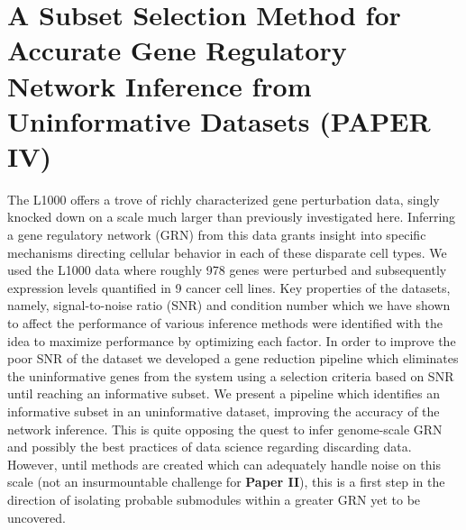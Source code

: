 

\section{A Subset Selection Method for Accurate Gene Regulatory Network Inference from Uninformative Datasets (PAPER IV)}\label{sec:paper4}

The L1000 \citep{subramanian2017next} offers a trove of richly characterized gene perturbation data, singly knocked down on a scale much larger than previously investigated here. Inferring a gene regulatory network (GRN) from this data grants insight into specific mechanisms directing cellular behavior in each of these disparate cell types. We used the L1000 data where roughly 978 genes were perturbed and subsequently expression levels quantified in 9 cancer cell lines. Key properties of the datasets, namely, signal-to-noise ratio (SNR) and condition number which we have shown to affect the performance of various inference methods were identified with the idea to maximize performance by optimizing each factor. 
In order to improve the poor SNR of the dataset we developed a gene reduction pipeline which eliminates the uninformative genes from the system using a selection criteria based on SNR until reaching an informative subset. We present a pipeline which identifies an informative subset in an uninformative dataset, improving the accuracy of the network inference.
This is quite opposing the quest to infer genome-scale GRN and possibly the best practices of data science regarding discarding data. However, until methods are created which can adequately handle noise on this scale (not an insurmountable challenge for \textbf{Paper II}), this is a first step in the direction of isolating probable submodules within a greater GRN yet to be uncovered.